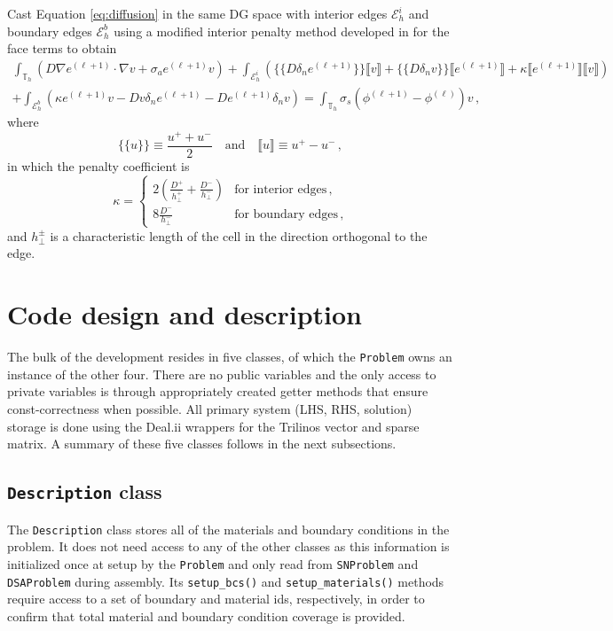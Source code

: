 \documentclass{article}
\begin{document}
Cast Equation \eqref{eq:diffusion} in the same DG space with interior edges $\mathcal{E}_h^i$ and boundary edges $\mathcal{E}_h^b$ using a modified interior penalty method developed in \cite{ragusa2010two} for the face terms to obtain
\begin{multline}
	\int_{\mathbb{T}_h} (D \nabla e^{(\ell + 1)} \cdot \nabla v + \sigma_a e^{(\ell + 1)} v) + \int_{\mathcal{E}_h^i} \left( \{\!\!\{ D \delta_n e^{(\ell + 1)} \}\!\!\} \llbracket v \rrbracket + \{\!\!\{ D \delta_n v \}\!\!\} \llbracket e^{(\ell + 1)} \rrbracket + \kappa \llbracket e^{(\ell + 1)} \rrbracket \llbracket v \rrbracket \right) \\
	+ \int_{\mathcal{E}_h^b} \left( \kappa e^{(\ell + 1)} v - D v \delta_n e^{(\ell + 1)} - D e^{(\ell + 1)} \delta_n v \right) = \int_{\mathbb{T}_h} \sigma_s (\phi^{(\ell + 1)} - \phi^{(\ell)}) v\,,
\end{multline}
	where
\[
	\{\!\!\{ u \}\!\!\} \equiv \frac{u^+ + u^-}{2} \quad \text{and} \quad \llbracket u \rrbracket \equiv u^+ - u^-\,,
\]
in which the penalty coefficient is
\[
	\kappa = \begin{cases} 2 \left(\frac{D^+}{h^+_\bot} + \frac{D^-}{h^-_\bot}\right) & \text{for~interior~edges}\,, \\ 8 \frac{D^-}{h^-_\bot} & \text{for~boundary~edges}\,, \end{cases}
\]
and $h^\pm_\bot$ is a characteristic length of the cell in the direction orthogonal to the edge.

\section{Code design and description}

The bulk of the development resides in five classes, of which the \texttt{Problem} owns an instance of the other four. There are no public variables and the only access to private variables is through appropriately created getter methods that ensure const-correctness when possible. All primary system (LHS, RHS, solution) storage is done using the Deal.ii wrappers for the Trilinos vector and sparse matrix. A summary of these five classes follows in the next subsections. 

\subsection{\texttt{Description} class}

The \texttt{Description} class stores all of the materials and boundary conditions in the problem. It does not need access to any of the other classes as this information is initialized once at setup by the \texttt{Problem} and only read from \texttt{SNProblem} and \texttt{DSAProblem} during assembly. Its \texttt{setup\_bcs()} and \texttt{setup\_materials()} methods require access to a set of boundary and material ids, respectively, in order to confirm that total material and boundary condition coverage is provided.
\end{document}

